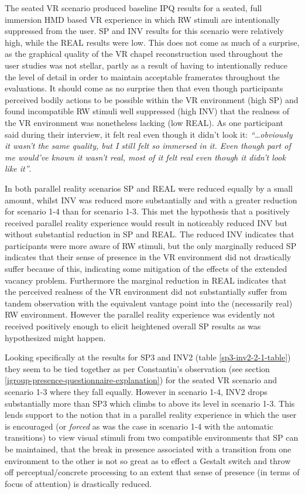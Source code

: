 The seated VR scenario produced baseline IPQ results for a seated, full immersion HMD based VR experience in which RW stimuli are intentionally suppressed from the user. SP and INV results for this scenario were relatively high, while the REAL results were low. This does not come as much of a surprise, as the graphical quality of the VR chapel reconstruction used throughout the user studies was not stellar, partly as a result of having to intentionally reduce the level of detail in order to maintain acceptable framerates throughout the evaluations. It should come as no surprise then that even though participants perceived bodily actions to be possible within the VR environment (high SP) and found incompatible RW stimuli well suppressed (high INV) that the realness of the VR environment was nonetheless lacking (low REAL). As one participant said during their interview, it felt real even though it didn't look it: \textit{``\ldots obviously it wasn't the same quality, but I still felt so immersed in it. Even though part of me would've known it wasn't real, most of it felt real even though it didn't look like it''}.

In both parallel reality scenarios SP and REAL were reduced equally by a small amount, whilst INV was reduced more substantially and with a greater reduction for scenario 1-4 than for scenario 1-3. This met the hypothesis that a positively received parallel reality experience would result in noticeably reduced INV but without substantial reduction in SP and REAL. The reduced INV indicates that participants were more aware of RW stimuli, but the only marginally reduced SP indicates that their sense of presence in the VR environment did not drastically suffer because of this, indicating some mitigation of the effects of the extended vacancy problem. Furthermore the marginal reduction in REAL indicates that the perceived realness of the VR environment did not substantially suffer from tandem observation with the equivalent vantage point into the (necessarily real) RW environment. However the parallel reality experience was evidently not received positively enough to elicit heightened overall SP results as was hypothesized might happen.

Looking specifically at the results for SP3 and INV2 (table \ref{sp3-inv2-2-1-table}) they seem to be tied together as per Constantin's observation (see section \ref{igroup-presence-questionnaire-explanation}) for the seated VR scenario and scenario 1-3 where they fall equally. However in scenario 1-4, INV2 drops substantially more than SP3 which climbs to above its level in scenario 1-3. This lends support to the notion that in a parallel reality experience in which the user is encouraged (or \textit{forced} as was the case in scenario 1-4 with the automatic transitions) to view visual stimuli from two compatible environments that SP can be maintained, that the break in presence associated with a transition from one environment to the other is not so great as to effect a Gestalt switch and throw off perceptual/concrete processing to an extent that sense of presence (in terms of focus of attention) is drastically reduced.

